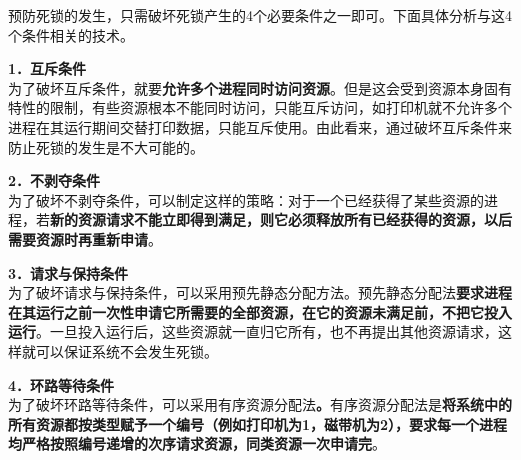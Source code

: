 预防死锁的发生，只需破坏死锁产生的4个必要条件之一即可。下面具体分析与这4个条件相关的技术。

\textbf{{1．互斥条件}}\\

{{为了破坏互斥条件，}}{就要}\textbf{{允许多个进程同时访问资源}}。但是这会受到资源本身固有特性的限制，有些资源根本不能同时访问，只能互斥访问，如打印机就不允许多个进程在其运行期间交替打印数据，只能互斥使用。由此看来，通过破坏互斥条件来防止死锁的发生是不大可能的。

\textbf{{2．不剥夺条件}}\\

为了破坏不剥夺条件，可以制定这样的策略：对于一个已经获得了某些资源的进程，若\textbf{{新的资源请求不能立即得到满足，则它必须释放所有已经获得的资源，以后需要资源时再重新申请}}。

\textbf{{3．请求与保持条件}}\\

为了破坏请求与保持条件，可以采用预先静态分配方法。预先静态分配法{\textbf{要求进程在其运行之前一次性申请它所需要的全部资源，在它的资源未满足前，不把它投入运行}}。一旦投入运行后，这些资源就一直归它所有，也不再提出其他资源请求，这样就可以保证系统不会发生死锁。

\textbf{{4．环路等待条件}}\\

为了破坏环路等待条件，可以采用有序资源分配法\textbf{。}有序资源分配法是{\textbf{将系统中的所有资源都按类型赋予一个编号（例如打印机为1，磁带机为2），要求每一个进程均严格按照编号递增的次序请求资源，同类资源一次申请完}}。
